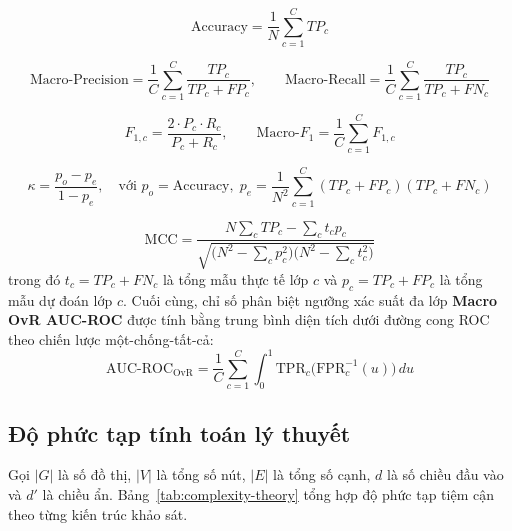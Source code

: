 \documentclass[11pt,a4paper]{extreport}
\begin{document}
\begin{equation}
    \text{Accuracy} = \frac{1}{N}\sum_{c=1}^{C} TP_c
    \label{eq:acc}
\end{equation}

\begin{equation}
    \text{Macro-Precision} = \frac{1}{C}\sum_{c=1}^{C} \frac{TP_c}{TP_c + FP_c}, \qquad
    \text{Macro-Recall} = \frac{1}{C}\sum_{c=1}^{C} \frac{TP_c}{TP_c + FN_c}
    \label{eq:prec-rec}
\end{equation}

\begin{equation}
    F_{1,c} = \frac{2 \cdot P_c \cdot R_c}{P_c + R_c}, \qquad
    \text{Macro-}F_1 = \frac{1}{C}\sum_{c=1}^{C} F_{1,c}
    \label{eq:f1}
\end{equation}

\begin{equation}
    \kappa = \frac{p_o - p_e}{1 - p_e}, \quad \text{với } p_o = \text{Accuracy},\; p_e = \frac{1}{N^2}\sum_{c=1}^{C}(TP_c + FP_c)(TP_c + FN_c)
    \label{eq:kappa}
\end{equation}

\begin{equation}
    \text{MCC} = \frac{N\sum_{c} TP_c - \sum_{c} t_c p_c}{\sqrt{\big(N^2 - \sum_{c} p_c^2\big)\big(N^2 - \sum_{c} t_c^2\big)}}
    \label{eq:mcc}
\end{equation}
trong đó $t_c = TP_c + FN_c$ là tổng mẫu thực tế lớp $c$ và $p_c = TP_c + FP_c$ là tổng mẫu dự đoán lớp $c$. Cuối cùng, chỉ số phân biệt ngưỡng xác suất đa lớp \textbf{Macro OvR AUC-ROC} được tính bằng trung bình diện tích dưới đường cong ROC theo chiến lược một-chống-tất-cả:
\begin{equation}
    \text{AUC-ROC}_{\text{OvR}} = \frac{1}{C}\sum_{c=1}^{C} \int_0^1 \text{TPR}_c\big(\text{FPR}_c^{-1}(u)\big)\,du
    \label{eq:auc}
\end{equation}

\subsection{Độ phức tạp tính toán lý thuyết}
Gọi $|G|$ là số đồ thị, $|V|$ là tổng số nút, $|E|$ là tổng số cạnh, $d$ là số chiều đầu vào và $d'$ là chiều ẩn. Bảng~\ref{tab:complexity-theory} tổng hợp độ phức tạp tiệm cận theo từng kiến trúc khảo sát.
\end{document}
